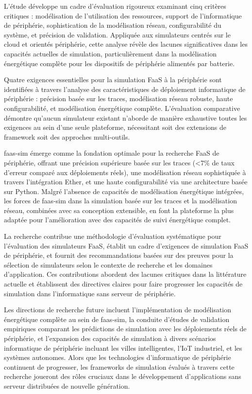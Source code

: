 L'étude développe un cadre d'évaluation rigoureux examinant cinq critères critiques : modélisation de l'utilisation des ressources, support de l'informatique de périphérie, sophistication de la modélisation réseau, configurabilité du système, et précision de validation. Appliquée aux simulateurs centrés sur le cloud et orientés périphérie, cette analyse révèle des lacunes significatives dans les capacités actuelles de simulation, particulièrement dans la modélisation énergétique complète pour les dispositifs de périphérie alimentés par batterie.

Quatre exigences essentielles pour la simulation FaaS à la périphérie sont identifiées à travers l'analyse des caractéristiques de déploiement informatique de périphérie : précision basée sur les traces, modélisation réseau robuste, haute configurabilité, et modélisation énergétique complète. L'évaluation comparative démontre qu'aucun simulateur existant n'aborde de manière exhaustive toutes les exigences au sein d'une seule plateforme, nécessitant soit des extensions de framework soit des approches multi-outils.

faas-sim émerge comme la fondation optimale pour la recherche FaaS de périphérie, offrant une précision supérieure basée sur les traces (<7\% de taux d'erreur comparé aux déploiements réels), une modélisation réseau sophistiquée à travers l'intégration Ether, et une haute configurabilité via une architecture basée sur Python. Malgré l'absence de capacités de modélisation énergétique intégrées, les forces de faas-sim dans la simulation basée sur les traces et la modélisation réseau, combinées avec sa conception extensible, en font la plateforme la plus adaptée pour l'amélioration avec des capacités de suivi énergétique complet.

La recherche contribue une méthodologie d'évaluation systématique pour l'évaluation des simulateurs FaaS, établit un cadre d'exigences de simulation FaaS de périphérie, et fournit des recommandations basées sur des preuves pour la sélection de simulateurs selon le contexte de recherche et les domaines d'application. Ces contributions abordent des lacunes critiques dans la littérature actuelle et établissent des directives claires pour faire progresser les capacités de simulation dans l'informatique sans serveur de périphérie.

Les directions de recherche future incluent l'implémentation de modélisation énergétique complète au sein de faas-sim, la conduite d'études de validation empiriques comparant les prédictions de simulation avec les déploiements réels de périphérie, et l'expansion des capacités de simulation à divers scénarios informatique de périphérie incluant les villes intelligentes, l'IoT industriel, et les systèmes autonomes. Alors que les technologies d'informatique de périphérie continuent de progresser, les frameworks de simulation évalués à travers cette recherche joueront des rôles cruciaux dans le développement d'applications sans serveur distribuées de nouvelle génération.


